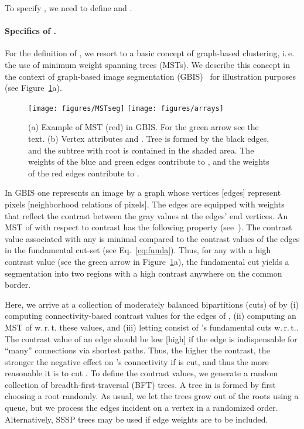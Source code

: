 \documentclass[pdftex]{llncs}
\newcommand{\ie}{i.\,e.\xspace}
\newcommand{\wrt}{w.\,r.\,t.\xspace}
\numberwithin{equation}{section}
\numberwithin{example}{section}
\numberwithin{table}{section}
\begin{document}
\noindent To specify , we need to define 
and .

\paragraph{Specifics of .}
For the definition of , we resort to a
basic concept of graph-based clustering, \ie the use of minimum weight
spanning trees (MSTs). We describe this concept in the context of
graph-based image segmentation
(GBIS)~\cite{Felzenszwalb2004a,Wassenberg2009a} for illustration
purposes (see Figure~\ref{fig:arrays}a).

\begin{figure}[tb]
\begin{centering}
\texttt{[image: figures/MSTseg]}
\hspace{12ex}
\texttt{[image: figures/arrays]}
\par\end{centering}
\caption{\label{fig:arrays} (a) Example of MST (red) in GBIS. For the
  green arrow see the text. (b) Vertex attributes  and
  . Tree  is formed by the black edges, and the
  subtree with root  is contained in the shaded area. The weights
  of the blue and green edges contribute to , and the
  weights of the red edges contribute to .}
\vspace{-0.5cm}
\end{figure}
In GBIS one represents an image by a graph  whose vertices [edges]
represent pixels [neighborhood relations of pixels]. The edges are
equipped with weights that reflect the contrast between the gray
values at the edges' end vertices. An MST  of  with respect to
contrast has the following property
(see~\cite[Thm.~4.3.3]{Jungnickel05a}).  The contrast value associated
with any  is minimal compared to the contrast values of
the edges in the fundamental cut-set  (see
Eq.~\ref{eq:funda}). Thus, for any  with a high contrast
value (see the green arrow in Figure~\ref{fig:arrays}a), the
fundamental cut  yields a segmentation into two regions
with a high contrast anywhere on the common border.

Here, we arrive at a collection  of 
moderately balanced bipartitions (cuts) of  by (i) computing
connectivity-based contrast values for the edges of , (ii)
computing an MST  of  \wrt these values, and (iii) letting
 consist of 's fundamental cuts \wrt . The
contrast value of an edge  should be low [high] if the
edge is indispensable for ``many'' connections via shortest
paths. Thus, the higher the contrast, the stronger the negative effect
on 's connectivity if  is cut, and thus the more reasonable it
is to cut .
To define the contrast values, we generate a random collection
 of breadth-first-traversal (BFT) trees. A tree in
 is formed by first choosing a root randomly. As usual,
we let the trees grow out of the roots using a queue, but we process
the edges incident on a vertex in a randomized order. Alternatively,
SSSP trees may be used if edge weights are to be included.
\end{document}
